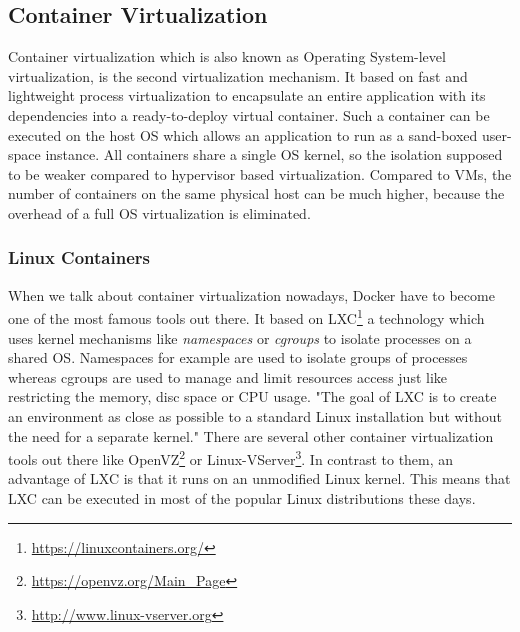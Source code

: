 \subsection{Container Virtualization}
Container virtualization which is also known as Operating System-level virtualization, is the second virtualization mechanism.
It based on fast and lightweight process virtualization to encapsulate an entire application with its dependencies into a ready-to-deploy virtual container.\cite[cf.][p. 72]{Tosatto:2015}
Such a container can be executed on the host \ac{OS} which allows an application to run as a sand-boxed user-space instance.\cite[cf.][p. 1]{Anderson:2016}
All containers share a single \ac{OS} kernel, so the isolation supposed to be weaker compared to hypervisor based virtualization.\cite[cf.][p. 2]{Celesti:2016}
Compared to \acp{VM}, the number of containers on the same physical host can be much higher, because the overhead of a full \ac{OS} virtualization is eliminated.\cite[cf.][p. 2]{Celesti:2016}


\subsubsection{Linux Containers}
When we talk about container virtualization nowadays, Docker have to become one of the most famous tools out there.
It based on \ac{LXC}\footnote{\url{https://linuxcontainers.org/}} a technology which uses kernel mechanisms like \textit{namespaces} or \textit{cgroups} to isolate processes on a shared \ac{OS}.\cite[cf.][p. 381]{Pahl:2015}
Namespaces for example are used to isolate groups of processes whereas cgroups are used to manage and limit resources access just like restricting the memory, disc space or \ac{CPU} usage.\cite[cf.][p. 381]{Pahl:2015}
"The goal of \ac{LXC} is to create an environment as close as possible to a standard Linux installation but without the need for a separate kernel."\cite[p. 72]{Tosatto:2015}
There are several other container virtualization tools out there like OpenVZ\footnote{\url{https://openvz.org/Main_Page}} or Linux-VServer\footnote{\url{http://www.linux-vserver.org}}.
In contrast to them, an advantage of \ac{LXC} is that it runs on an unmodified Linux kernel.
This means that \ac{LXC} can be executed in most of the popular Linux distributions these days.


